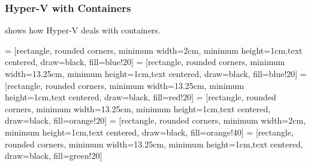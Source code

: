 \documentclass[nomenclature, english, bibtex]{kththesis}
\begin{document}
\subsubsection{Hyper-V with Containers}
  shows how Hyper-V deals with containers.
 
 = [rectangle, rounded corners, minimum width=2cm, minimum height=1cm,text centered, draw=black, fill=blue!20]
 = [rectangle, rounded corners, minimum width=13.25cm, minimum height=1cm,text centered, draw=black, fill=blue!20]
 = [rectangle, rounded corners, minimum width=13.25cm, minimum height=1cm,text centered, draw=black, fill=red!20]
 = [rectangle, rounded corners, minimum width=13.25cm, minimum height=1cm,text centered, draw=black, fill=orange!20]
 = [rectangle, rounded corners, minimum width=2cm, minimum height=1cm,text centered, draw=black, fill=orange!40]
 = [rectangle, rounded corners, minimum width=13.25cm, minimum height=1cm,text centered, draw=black, fill=green!20]
\end{document}
